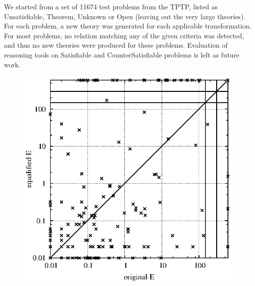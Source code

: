 \documentclass{article}
\begin{document}
We started from a set of 11674 test problems from the TPTP, listed as Unsatisfiable, Theorem, Unknown or Open (leaving out the very large theories). For each problem, a new theory was generated for each applicable transformation. For most problems, no relation matching any of the given criteria was detected, and thus no new theories were produced for these problems. Evaluation of reasoning tools on Satisfiable and CounterSatisfiable problems is left as future work.

\begin{figure}[t]
\begin{center}
\includegraphics[scale=0.65,trim=10mm 00mm 20mm 0mm]{Plots/Equalified/E/test_original_e_equalified_e_300.eps}

\end{center}
\end{figure}
\end{document}
